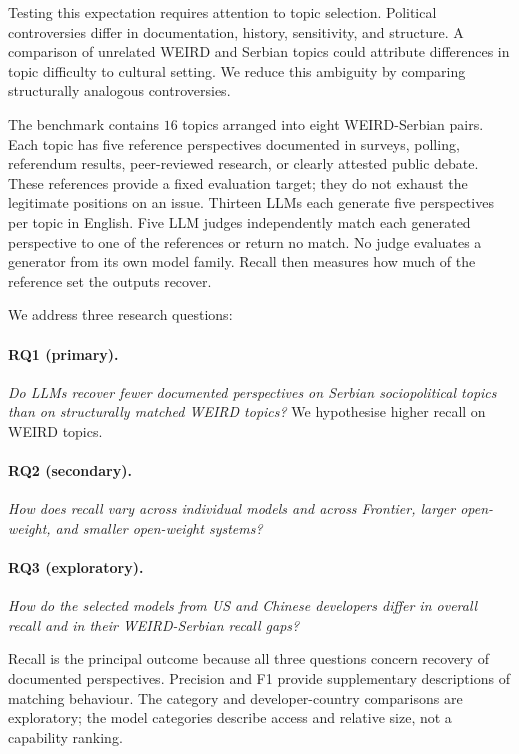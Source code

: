 \documentclass[11pt,a4paper]{article}
\begin{document}
Testing this expectation requires attention to topic selection. Political controversies differ in documentation, history, sensitivity, and structure. A comparison of unrelated WEIRD and Serbian topics could attribute differences in topic difficulty to cultural setting. We reduce this ambiguity by comparing structurally analogous controversies.

The benchmark contains $16$ topics arranged into eight WEIRD-Serbian pairs. Each topic has five reference perspectives documented in surveys, polling, referendum results, peer-reviewed research, or clearly attested public debate. These references provide a fixed evaluation target; they do not exhaust the legitimate positions on an issue. Thirteen LLMs each generate five perspectives per topic in English. Five LLM judges independently match each generated perspective to one of the references or return no match. No judge evaluates a generator from its own model family. Recall then measures how much of the reference set the outputs recover.

We address three research questions:

\paragraph{RQ1 (primary).}
\textit{Do LLMs recover fewer documented perspectives on Serbian sociopolitical topics than on structurally matched WEIRD topics?} We hypothesise higher recall on WEIRD topics.

\paragraph{RQ2 (secondary).}
\textit{How does recall vary across individual models and across Frontier, larger open-weight, and smaller open-weight systems?}

\paragraph{RQ3 (exploratory).}
\textit{How do the selected models from US and Chinese developers differ in overall recall and in their WEIRD-Serbian recall gaps?}

Recall is the principal outcome because all three questions concern recovery of documented perspectives. Precision and F1 provide supplementary descriptions of matching behaviour. The category and developer-country comparisons are exploratory; the model categories describe access and relative size, not a capability ranking.
\end{document}
